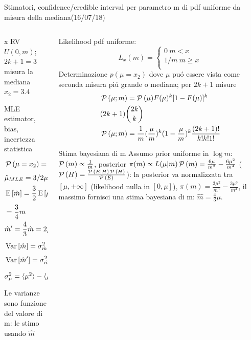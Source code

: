 \documentclass[asd-beamer.tex]{subfiles}
\begin{document}
\begin{frame}{Stimatori, confidence/credible interval per parametro m di pdf uniforme da misura della mediana(16/07/18)}
\begin{columns}[T]\begin{column}{0.5\textwidth}
x RV $U(0,m)$; $2k+1=3$ misura la mediana $x_2=3.4$
\begin{block}{MLE estimator, bias, incertezza statistica}
\begin{align*}
&\operatorname{\mathcal{P}}{(\mu=x_2)}=6\frac{\mu}{m^2}(1-\frac{\mu}{m})\\
&\hat{\mu}_{MLE}=3/2\mu\\
&\operatorname{E}{[\hat{m}]}=\frac{3}{2}\operatorname{E}{[\mu]}\frac{3}{2}\int_0^{m}\mu\operatorname{\mathcal{P}}{(\mu)}\,d\mu\\
&=\frac{3}{4}m\\
&\hat{m}'=\frac{4}{3}\hat{m}=2\mu\\
&\operatorname{Var}{[\hat{m}]}=\sigma^2_{\hat{m}}=\frac{9}{4}\operatorname{Var}{\mu}=\frac{9}{4}\sigma_{\mu}^2\\
&\operatorname{Var}{[\hat{m}']}=\sigma^2_{\hat{m}'}=4\operatorname{Var}{\mu}=4\sigma_{\mu}^2\\
&\sigma^2_{\mu}=\langle \mu^2 \rangle-\langle \mu \rangle^2=\frac{m^2}{20}
\end{align*}
Le varianze sono funzione del valore di m: le stimo usando $\hat{m}$
\end{block}
\end{column}\begin{column}{0.5\textwidth}
Likelihood pdf uniforme: \begin{equation*}L_x(m)=\left\{\begin{array}{c}
0\ m<x\\
1/m\ m\geq x\\
\end{array}\right.
\end{equation*}
Determinazione $p(\mu=x_2)$ dove $\mu$ pu\'o essere vista come seconda misura pi\'u grande o mediana; per $2k+1$ misure
\begin{align*}
&\operatorname{\mathcal{P}}{(\mu;m)}=\operatorname{\mathcal{P}}{(\mu)}F(\mu)^k[1-F(\mu)]^k\\
&(2k+1)\binom{2k}{k}\\
&\operatorname{\mathcal{P}}{(\mu;m)}=\frac{1}{m}(\frac{\mu}{m})^k(1-\frac{\mu}{m})^k\frac{(2k+1)!}{k!k!1!}
\end{align*}
\vspace{5cm}
\begin{block}{Stima bayesiana di m}
Assumo prior uniforme in $\log{m}$: $\operatorname{\mathcal{P}}{(m)}\propto\frac{1}{m}$, posterior $\pi(m)\propto L(\mu|m)\operatorname{\mathcal{P}}{(m)}=\frac{6\mu}{m^3}-\frac{6\mu^2}{m^4}$ ($\operatorname{\mathcal{P}}{(H)}=\frac{\operatorname{\mathcal{P}}{(E|H)\operatorname{\mathcal{P}}{(H)}}}{\operatorname{\mathcal{P}}{(E)}}$): la posterior va normalizzata tra $[\mu,+\infty]$ (likelihood nulla  in $[0,\mu]$), $\pi(m)=\frac{3\mu^2}{m^3}-\frac{3\mu^3}{m^4}$, il massimo fornisci una stima bayesiana di m: $\hat{m}=\frac{4}{3}\mu$.
\end{block}
\end{column}\end{columns}
\end{frame}
\end{document}
